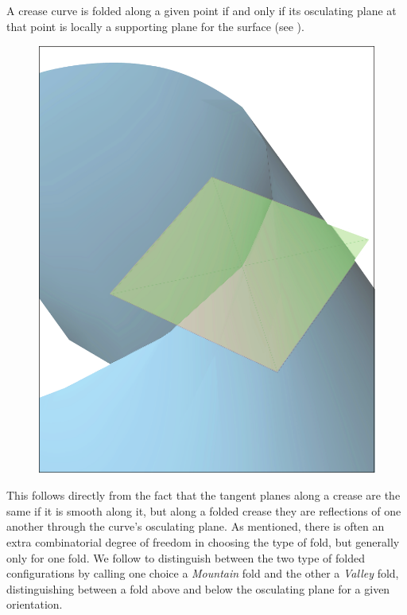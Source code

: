 \begin{theorem}\label{Thm:supporting_plane}
A crease curve is folded along a given point if and only if its osculating plane at that point is locally a supporting plane for the surface (see ).
\end{theorem}

\begin{figure} [h]
	\centering
	\includegraphics[width=0.5\linewidth]{figures/plane_side}
	\caption{}
	\label{fig:plane_side}
\end{figure}

This follows directly from the fact that the tangent planes along a crease are the same if it is smooth along it, but along a folded crease they are reflections of one another through the curve's osculating plane. As mentioned, there is often an extra combinatorial degree of freedom in choosing the type of fold, but generally only for one fold. We follow \cite{demaine_lens} to distinguish between the two type of folded configurations by calling one choice a \textit{Mountain} fold and the other a \textit{Valley} fold, distinguishing between a fold above and below the osculating plane for a given orientation. %



